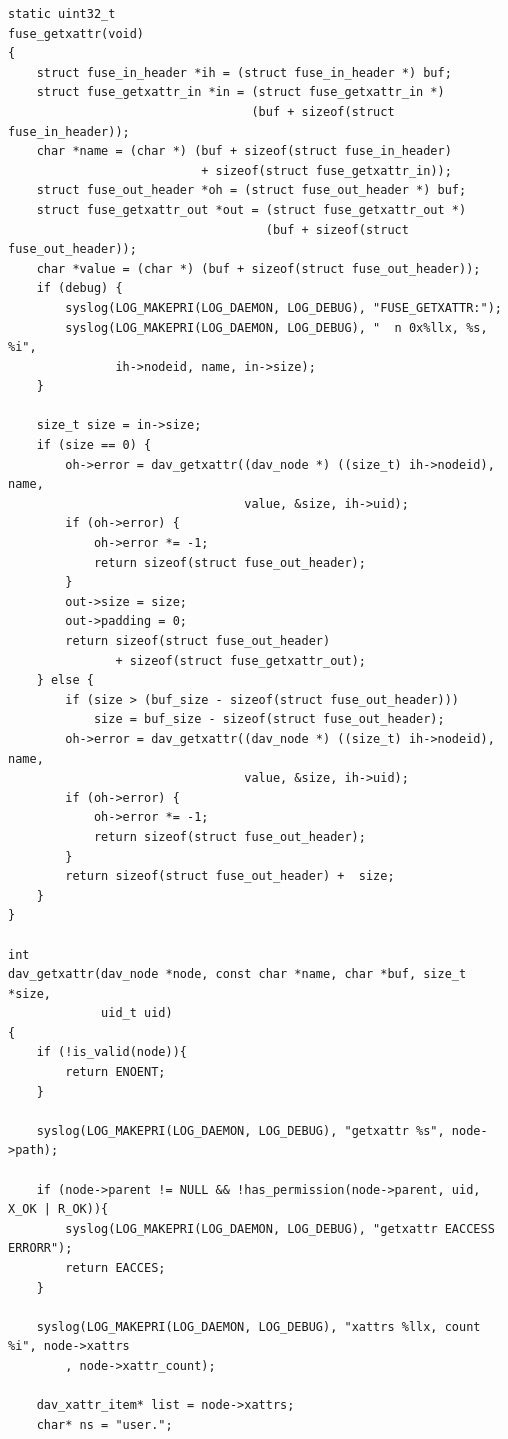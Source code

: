 \documentclass[utf8,usehyperref,12pt]{G7-32}
\begin{document}
\begin{verbatim}
static uint32_t
fuse_getxattr(void)
{
    struct fuse_in_header *ih = (struct fuse_in_header *) buf;
    struct fuse_getxattr_in *in = (struct fuse_getxattr_in *)
                                  (buf + sizeof(struct fuse_in_header));
    char *name = (char *) (buf + sizeof(struct fuse_in_header)
                           + sizeof(struct fuse_getxattr_in));
    struct fuse_out_header *oh = (struct fuse_out_header *) buf;
    struct fuse_getxattr_out *out = (struct fuse_getxattr_out *)
                                    (buf + sizeof(struct fuse_out_header));
    char *value = (char *) (buf + sizeof(struct fuse_out_header));
    if (debug) {
        syslog(LOG_MAKEPRI(LOG_DAEMON, LOG_DEBUG), "FUSE_GETXATTR:");
        syslog(LOG_MAKEPRI(LOG_DAEMON, LOG_DEBUG), "  n 0x%llx, %s, %i",
               ih->nodeid, name, in->size);
    }

    size_t size = in->size;
    if (size == 0) {
        oh->error = dav_getxattr((dav_node *) ((size_t) ih->nodeid), name,
                                 value, &size, ih->uid);
        if (oh->error) {
            oh->error *= -1;
            return sizeof(struct fuse_out_header);
        }
        out->size = size;
        out->padding = 0;
        return sizeof(struct fuse_out_header)
               + sizeof(struct fuse_getxattr_out);
    } else {
        if (size > (buf_size - sizeof(struct fuse_out_header)))
            size = buf_size - sizeof(struct fuse_out_header);
        oh->error = dav_getxattr((dav_node *) ((size_t) ih->nodeid), name,
                                 value, &size, ih->uid);
        if (oh->error) {
            oh->error *= -1;
            return sizeof(struct fuse_out_header);
        }
        return sizeof(struct fuse_out_header) +  size;
    }
}

int
dav_getxattr(dav_node *node, const char *name, char *buf, size_t *size,
             uid_t uid)
{
    if (!is_valid(node)){
        return ENOENT;
    }

    syslog(LOG_MAKEPRI(LOG_DAEMON, LOG_DEBUG), "getxattr %s", node->path);

    if (node->parent != NULL && !has_permission(node->parent, uid, X_OK | R_OK)){
    	syslog(LOG_MAKEPRI(LOG_DAEMON, LOG_DEBUG), "getxattr EACCESS ERRORR");
        return EACCES;
    }

    syslog(LOG_MAKEPRI(LOG_DAEMON, LOG_DEBUG), "xattrs %llx, count %i", node->xattrs
    	, node->xattr_count);

    dav_xattr_item* list = node->xattrs;
    char* ns = "user.";


\end{verbatim}
\end{document}
